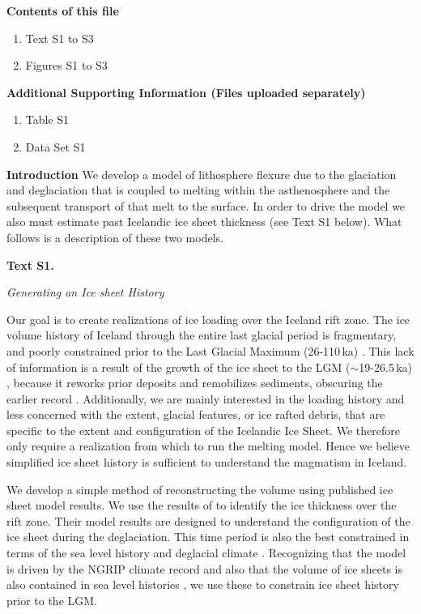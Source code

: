 \documentclass[draft,grl]{agutexSI2018}
\begin{document}
\begin{article}

\noindent\textbf{Contents of this file}
\begin{enumerate}
\item Text S1 to S3
\item Figures S1 to S3
\end{enumerate}
\noindent\textbf{Additional Supporting Information (Files uploaded separately)}
\begin{enumerate}
\item Table S1
\item Data Set S1
\end{enumerate}

\clearpage

\noindent\textbf{Introduction}
We develop a model of lithosphere flexure due to the glaciation and deglaciation that is coupled to melting within the asthenosphere and the subsequent transport of that melt to the surface. In order to drive the model we also must estimate past Icelandic ice sheet thickness (see Text S1 below). What follows is a description of these two models.

\noindent\textbf{Text S1.}

\noindent\textit{Generating an Ice sheet History}

Our goal is to create realizations of ice loading over the Iceland rift zone. The ice volume history of Iceland through the entire last glacial period is fragmentary, and poorly constrained prior to the Last Glacial Maximum (26-110\,ka) \citep{geirsdottir-2011}.  This lack of information is a result of the growth of the ice sheet to the LGM ($\sim$19-26.5\,ka) \citep{geirsdottir-2011,clark-etal-2009}, because it reworks prior deposits and remobilizes sediments, obscuring the earlier record \citep{andrews-2008}. Additionally, we are mainly interested in the loading history and less concerned with the extent, glacial features, or ice rafted debris, that are specific to the extent and configuration of the Icelandic Ice Sheet. We therefore only require a realization from which to run the melting model. Hence we believe simplified ice sheet history is sufficient to understand the magmatism in Iceland. 

We develop a simple method of reconstructing the volume using published ice sheet model results. We use the results of \citet{patton-etal-2017} to identify the ice thickness over the rift zone. Their model results are designed to understand the configuration of the ice sheet during the deglaciation. This time period is also the best constrained in terms of the sea level history \citep{spratt-2016,andersen-etal-2004} and deglacial climate \citep{lambeck-2001}. Recognizing that the \citet{patton-etal-2017} model is driven by the NGRIP climate record \citep{lambeck-2001} and also that the volume of ice sheets is also contained in sea level histories \citep{spratt-2016}, we use these to constrain ice sheet history prior to the LGM.


\end{article}
\end{document}
